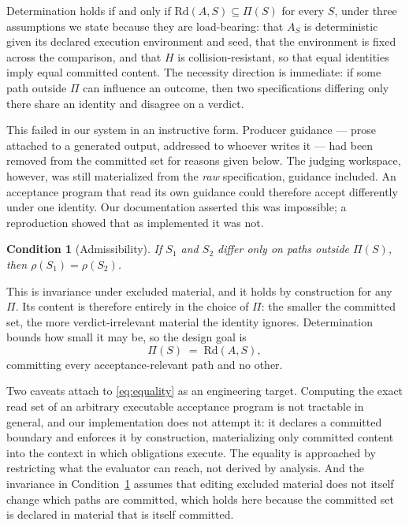 \documentclass[10pt,twocolumn]{article}
\newtheorem{condition}{Condition}
\newcommand{\Rd}{\mathrm{Rd}}
\begin{document}
Determination holds if and only if $\Rd(A,S) \subseteq \Pi(S)$ for every
$S$, under three assumptions we state because they are load-bearing:
that $A_S$ is deterministic given its declared execution environment and
seed, that the environment is fixed across the comparison, and that $H$
is collision-resistant, so that equal identities imply equal committed
content. The necessity direction is immediate: if some path outside $\Pi$ can
influence an outcome, then two specifications differing only there share
an identity and disagree on a verdict.

This failed in our system in an instructive form. Producer guidance ---
prose attached to a generated output, addressed to whoever writes it ---
had been removed from the committed set for reasons given below. The
judging workspace, however, was still materialized from the \emph{raw}
specification, guidance included. An acceptance program that read its own
guidance could therefore accept differently under one identity. Our
documentation asserted this was impossible; a reproduction showed that as
implemented it was not.

\begin{condition}[Admissibility]
\label{cond:adm}
If $S_1$ and $S_2$ differ only on paths outside $\Pi(S)$, then
$\rho(S_1) = \rho(S_2)$.
\end{condition}

This is invariance under excluded material, and it holds by construction
for any $\Pi$. Its content is therefore entirely in the choice of $\Pi$:
the smaller the committed set, the more verdict-irrelevant material the
identity ignores. Determination bounds how small it may be, so the design
goal is
\begin{equation}
\Pi(S) \;=\; \Rd(A,S),
\label{eq:equality}
\end{equation}
committing every acceptance-relevant path and no other.

Two caveats attach to \eqref{eq:equality} as an engineering target.
Computing the exact read set of an arbitrary executable acceptance
program is not tractable in general, and our implementation does not
attempt it: it declares a committed boundary and enforces it by
construction, materializing only committed content into the context in
which obligations execute. The equality is approached by restricting
what the evaluator can reach, not derived by analysis. And the
invariance in Condition~\ref{cond:adm} assumes that editing excluded
material does not itself change which paths are committed, which holds
here because the committed set is declared in material that is itself
committed.
\end{document}

